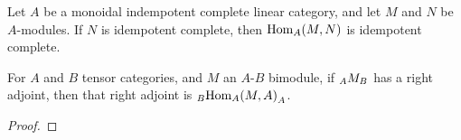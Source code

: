 \documentclass{amsart}
\begin{document}
\begin{example}
\end{example}


\begin{proposition} 
Let $A$ be a  monoidal indempotent complete linear category, and let $M$ and $N$ be $A$-modules.  If $N$ is idempotent complete, then $\operatorname{Hom}_A(M,N)$ is idempotent complete.
\end{proposition}

\begin{corollary}
For $A$ and $B$ tensor categories, and $M$ an $A$-$B$ bimodule, if ${}_{A} {M}_{B}$ has a right adjoint, then that right adjoint is ${}_{B} {\operatorname{Hom}_A(M,A)}_{A}$.
\end{corollary}

\begin{proof}
\end{proof}







\end{document}
